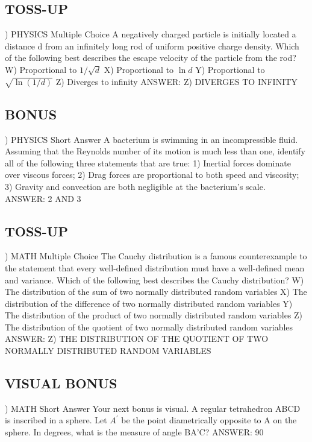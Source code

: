 \documentclass{article}
\begin{document}
\subsection*{TOSS-UP}
) PHYSICS Multiple Choice A negatively charged particle is initially located a distance d from an infinitely long rod of uniform positive charge density. Which of the following best describes the escape velocity of the particle from the rod?
\noindent W) Proportional to $1/\sqrt{d}$
\noindent X) Proportional to $\ln d$
\noindent Y) Proportional to $\sqrt{\ln(1/d)}$
\noindent Z) Diverges to infinity
\noindent ANSWER: Z) DIVERGES TO INFINITY

\subsection*{BONUS}
) PHYSICS Short Answer A bacterium is swimming in an incompressible fluid. Assuming that the Reynolds number of its motion is much less than one, identify all of the following three statements that are true: 1) Inertial forces dominate over viscous forces; 2) Drag forces are proportional to both speed and viscosity; 3) Gravity and convection are both negligible at the bacterium's scale.
\noindent ANSWER: 2 AND 3

\subsection*{TOSS-UP}
) MATH Multiple Choice The Cauchy distribution is a famous counterexample to the statement that every well-defined distribution must have a well-defined mean and variance. Which of the following best describes the Cauchy distribution?
\noindent W) The distribution of the sum of two normally distributed random variables
\noindent X) The distribution of the difference of two normally distributed random variables
\noindent Y) The distribution of the product of two normally distributed random variables
\noindent Z) The distribution of the quotient of two normally distributed random variables
\noindent ANSWER: Z) THE DISTRIBUTION OF THE QUOTIENT OF TWO NORMALLY DISTRIBUTED RANDOM VARIABLES

\subsection*{VISUAL BONUS}
) MATH Short Answer Your next bonus is visual. A regular tetrahedron ABCD is inscribed in a sphere. Let $A^{\prime}$ be the point diametrically opposite to A on the sphere. In degrees, what is the measure of angle BA'C?
\noindent ANSWER: 90
\end{document}
